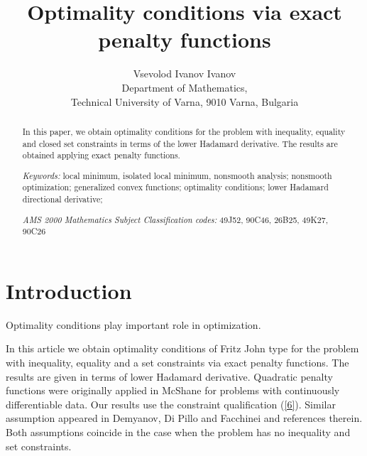 \documentclass[12pt]{article}
\begin{document}
\title{Optimality conditions via exact penalty functions}

\author{Vsevolod Ivanov Ivanov
\\
Department of Mathematics, \\
Technical University of Varna, 9010 Varna, Bulgaria
}

\maketitle

\begin{abstract}
In this paper, we obtain optimality conditions for the problem with inequality,  equality and closed set constraints in terms of the lower Hadamard derivative. The results are obtained applying exact penalty functions. 

{\it Keywords:} local minimum, isolated local minimum, nonsmooth analysis; nonsmooth optimization;
generalized convex functions; optimality conditions;
lower Hadamard directional derivative;

{\it AMS 2000 Mathematics Subject Classification  codes:}
49J52, 90C46, 26B25, 49K27, 90C26

\end{abstract}

\section{Introduction}
\label{s1}
Optimality conditions play important role in optimization.

In this article we obtain optimality conditions of Fritz John type for the
problem with inequality, equality and a set constraints via exact penalty
functions. The results are given in terms of lower Hadamard derivative.
Quadratic penalty functions were originally applied in McShane \cite{McS73}
for problems with continuously differentiable data. Our results use the
constraint qualification (\ref{6}). Similar assumption appeared in
Demyanov, Di Pillo and Facchinei \cite{dem98} and references therein.
Both assumptions coincide in the case when the problem has no inequality
and set constraints.
\end{document}
